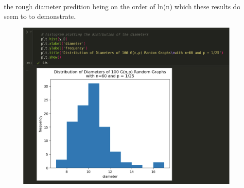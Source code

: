 \documentclass{article}
\begin{document}
\begin{enumerate}[label=(\alph*), left=10pt, itemsep=10pt]
\begin{minipage}[t]{0.9\textwidth}
            the rough diameter predition being on the order of ln(n) which these results do seem to to demonstrate.  
            \begin{figure}[H]
                \centering
                \includegraphics[width=1\textwidth, height=0.35\textheight]{./3biv.png}
            \end{figure}
        \end{minipage}

    \end{enumerate}
\end{document}
